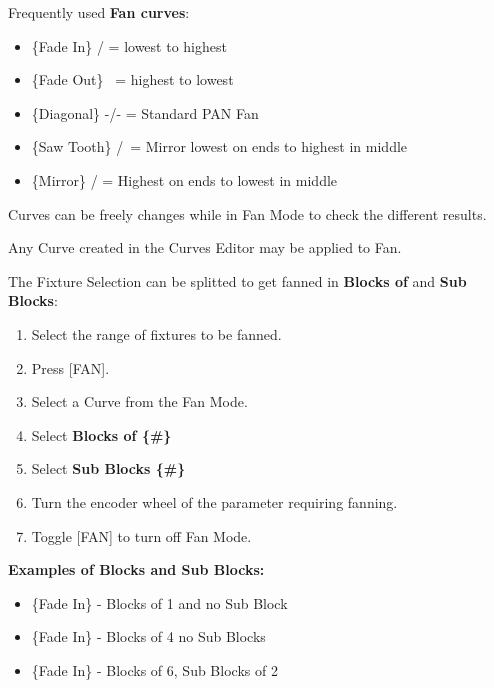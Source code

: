\documentclass[
]{article}
\providecommand{\tightlist}{%
  \setlength{\itemsep}{0pt}\setlength{\parskip}{0pt}}
\begin{document}
Frequently used \textbf{Fan curves}:

\begin{itemize}
\item
  \{Fade In\} / = lowest to highest
\item
  \{Fade Out\} ~= highest to lowest
\item
  \{Diagonal\} -/- = Standard PAN Fan
\item
  \{Saw Tooth\} /~= Mirror lowest on ends to highest in middle
\item
  \{Mirror\} / = Highest on ends to lowest in middle
\end{itemize}

Curves can be freely changes while in Fan Mode to check the different results.

Any Curve created in the Curves Editor may be applied to Fan.

The Fixture Selection can be splitted to get fanned in \textbf{Blocks of} and \textbf{Sub Blocks}:

\begin{enumerate}
\def\labelenumi{\arabic{enumi}.}
\item
  Select the range of fixtures to be fanned.
\item
  Press {[}FAN{]}.
\item
  Select a Curve from the Fan Mode.
\item
  Select \textbf{Blocks of \{\#\}}
\item
  Select \textbf{Sub Blocks \{\#\}}
\item
  Turn the encoder wheel of the parameter requiring fanning.
\item
  Toggle {[}FAN{]} to turn off Fan Mode.
\end{enumerate}

\textbf{Examples of Blocks and Sub Blocks:}

\begin{itemize}
\tightlist
\item
  \{Fade In\} - Blocks of 1 and no Sub Block
\end{itemize}

\begin{itemize}
\tightlist
\item
  \{Fade In\} - Blocks of 4 no Sub Blocks
\end{itemize}

\begin{itemize}
\tightlist
\item
  \{Fade In\} - Blocks of 6, Sub Blocks of 2
\end{itemize}
\end{document}
